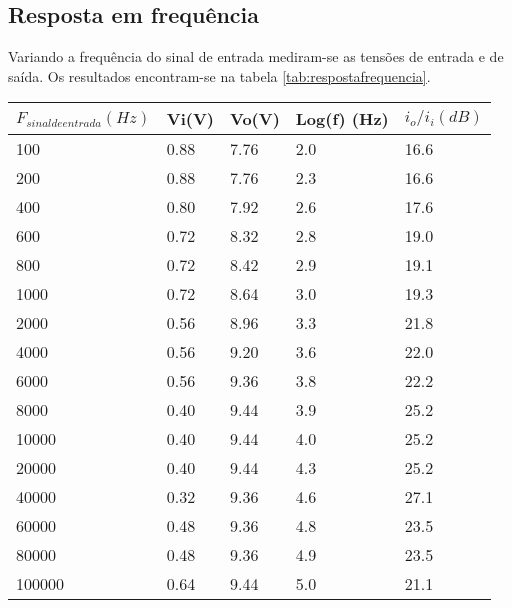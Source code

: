 \documentclass[%
  reprint,
  nofootinbib,
  amsmath,amssymb,
  aps,
  10pt,
  a4paper
]{revtex4-1}
\begin{document}
\subsection{Resposta em frequência}
Variando a frequência do sinal de entrada mediram-se as tensões de entrada e de saída. Os resultados encontram-se na tabela \ref{tab:respostafrequencia}.
\begin{table}[h]
    \begin{tabular}{|l|l|l|l|l|}
    \hline
    $F_{sinal de entrada} (Hz)$ & Vi(V) & Vo(V)& Log(f) (Hz)& $i_o/i_i (dB)$ \\ \hline
    100                                               & 0.88  & 7.76 & 2.0	& 16.6                                  \\ \hline
    200                              		    & 0.88  & 7.76 & 2.3	&16.6		\\ \hline
    400                              		    & 0.80 & 7.92 & 2.6	&17.6			\\ \hline
    600                              		    & 0.72  & 8.32 & 2.8	&19.0			\\ \hline
    800                              		    & 0.72  & 8.42 & 2.9	&19.1			\\ \hline
    1000                             		    & 0.72  & 8.64&  3.0	&19.3			\\ \hline
    2000                             		    & 0.56  & 8.96&  3.3	&21.8			\\ \hline
    4000                             		    & 0.56  & 9.20&  3.6	&22.0			\\ \hline
    6000                             		    & 0.56  & 9.36&  3.8	&22.2			\\ \hline
    8000                             		    & 0.40  & 9.44&  3.9	&25.2			\\ \hline
    10000                            		    & 0.40  & 9.44&  4.0	&25.2				\\ \hline
    20000                            		    & 0.40  & 9.44&  4.3	&25.2				\\ \hline
    40000                            		    & 0.32  & 9.36&  4.6	&27.1				\\ \hline
    60000                            		    & 0.48  & 9.36&  4.8	&23.5				\\ \hline
    80000                            		    & 0.48  & 9.36&  4.9	&23.5				\\ \hline
    100000                           	    & 0.64  & 9.44&  5.0	&21.1				\\ \hline

\end{tabular}
\end{table}
\end{document}
